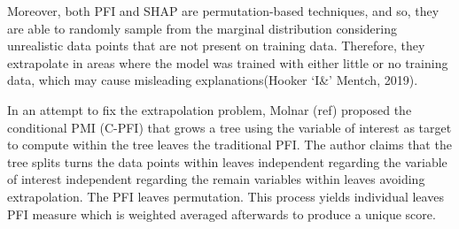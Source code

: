 Moreover, both PFI and SHAP are permutation-based techniques, and so, they are able to randomly sample from the marginal distribution considering unrealistic data points that are not present on training data. Therefore, they extrapolate in areas where the model was trained with either little or no training data, which may cause misleading explanations(Hooker `I\&' Mentch, 2019).

In an attempt to fix the extrapolation problem, Molnar (ref) proposed the conditional PMI (C-PFI) that grows a tree using the variable of interest as target to compute within the tree leaves the traditional PFI. The author claims that the tree splits turns the data points within leaves independent regarding the variable of interest independent regarding the remain variables within leaves avoiding extrapolation. The PFI leaves  
permutation. This process yields individual leaves PFI measure  which is weighted averaged afterwards to produce a unique score. 



